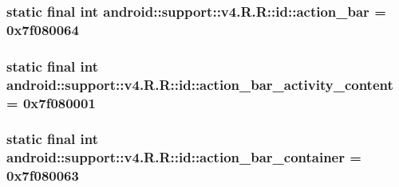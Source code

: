 \hypertarget{classandroid_1_1support_1_1v4_1_1_r_1_1id_66571409e044861b01fd10bf2f56f731}{
\subsubsection[{action\_\-bar}]{\setlength{\rightskip}{0pt plus 5cm}static final int android::support::v4.R.R::id::action\_\-bar = 0x7f080064}}
\label{classandroid_1_1support_1_1v4_1_1_r_1_1id_66571409e044861b01fd10bf2f56f731}


\hypertarget{classandroid_1_1support_1_1v4_1_1_r_1_1id_bb9d4f45676defa37a4b24184eeefad6}{
\subsubsection[{action\_\-bar\_\-activity\_\-content}]{\setlength{\rightskip}{0pt plus 5cm}static final int android::support::v4.R.R::id::action\_\-bar\_\-activity\_\-content = 0x7f080001}}
\label{classandroid_1_1support_1_1v4_1_1_r_1_1id_bb9d4f45676defa37a4b24184eeefad6}


\hypertarget{classandroid_1_1support_1_1v4_1_1_r_1_1id_dc250103f05b9fd0792dd1e6582f7c23}{
\subsubsection[{action\_\-bar\_\-container}]{\setlength{\rightskip}{0pt plus 5cm}static final int android::support::v4.R.R::id::action\_\-bar\_\-container = 0x7f080063}}
\label{classandroid_1_1support_1_1v4_1_1_r_1_1id_dc250103f05b9fd0792dd1e6582f7c23}



